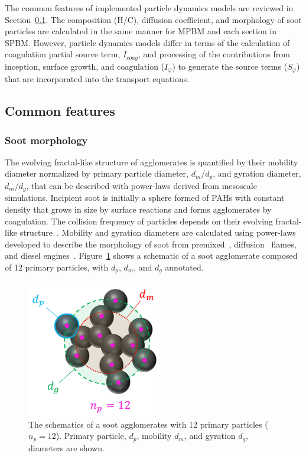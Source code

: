 The common features of implemented particle dynamics models are reviewed in Section~\ref{sec:pdynamiccommon}. The composition (H/C), diffusion coefficient, and morphology of soot particles are calculated in the same manner for MPBM and each section in SPBM. However, particle dynamics models differ in terms of the calculation of coagulation partial source term, $I_{coag}$, and processing of the contributions from inception, surface growth, and coagulation ($I_{\varphi}$) to generate the source terms ($S_{\varphi}$) that are incorporated into the transport equations.

\subsection{Common features}
\label{sec:pdynamiccommon}
\subsubsection{Soot morphology}
\label{sec:sootmorphology}

The evolving fractal-like structure of agglomerates is quantified by their mobility diameter normalized by primary particle diameter, $d_m/d_p$, and gyration diameter, $d_m/d_g$, that can be described with power-laws derived from mesoscale simulations.
Incipient soot is initially a sphere formed of PAHs with constant density that grows in size by surface reactions and forms agglomerates by coagulation. The collision frequency of particles depends on their evolving fractal-like structure~\citep{mulholland1988cluster}.
Mobility and gyration diameters are calculated using power-laws developed to describe the morphology of soot from premixed~\citep{abid2008evolution}, diffusion~\citep{yon2015simple} flames, and diesel engines~\citep{rissler2013effective}. Figure~\ref{fig:Morphology} shows a schematic of a soot agglomerate composed of 12 primary particles, with ${d_p}$, ${d_m}$, and ${d_g}$ annotated.
\begin{figure}[!htbp]
	\centering
	\includegraphics[height=60mm, ]{Figures/Theory/Morphology.pdf}
	\caption{The schematics of a soot agglomerates with 12 primary particles (${n_p=12}$). Primary particle, ${d_p}$, mobility ${d_m}$, and gyration ${d_g}$, diameters are shown.}
	\label{fig:Morphology}
\end{figure} 


